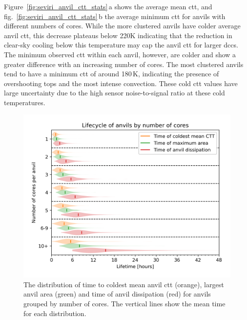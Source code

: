 Figure~\ref{fig:seviri_anvil_ctt_stats}\,a shows the average mean \acrshort{ctt}, and fig.~\ref{fig:seviri_anvil_ctt_stats}\,b the average minimum \acrshort{ctt} for anvils with different numbers of cores. 
While the more clustered anvils have colder average anvil \acrshort{ctt}, this decrease plateaus below 220K indicating that the reduction in clear-sky cooling below this temperature may cap the anvil \acrshort{ctt} for larger \acrshort{dcc}s. 
The minimum observed \acrshort{ctt} within each anvil, however, are colder and show a greater difference with an increasing number of cores. 
The most clustered anvils tend to have a minimum \acrshort{ctt} of around 180\,\unit{K}, indicating the presence of overshooting tops and the most intense convection. 
These cold \acrshort{ctt} values have large uncertainty due to the high sensor noise-to-signal ratio at these cold temperatures.


\begin{figure}[tp]
    \includegraphics[width=\textwidth]{figures/chapter4_11.png}
    \caption[
    The distribution of time to coldest mean anvil \acrshort{ctt}, largest anvil area and time of anvil dissipation
    ]{
    The distribution of time to coldest mean anvil \acrshort{ctt} (orange), largest anvil area (green) and time of anvil dissipation (red) for anvils grouped by number of cores. The vertical lines show the mean time for each distribution.
    }
    \label{fig:seviri_lifetime_dists}
\end{figure}


